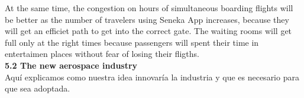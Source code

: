 \documentclass[]{article}
\begin{document}
At the same time, the congestion on hours of simultaneous boarding flights will be better as the number of travelers using Seneka App increases, because they will get an efficiet path to get into the correct gate. The waiting rooms will get full only at the right times because passengers will spent their time in entertaimen places without fear of losing their fligths.\\

\Large{\textbf{5.2 The new aerospace industry}\\}
Aquí explicamos como nuestra idea innovaría la industria y que es necesario para que sea adoptada.
\end{document}
